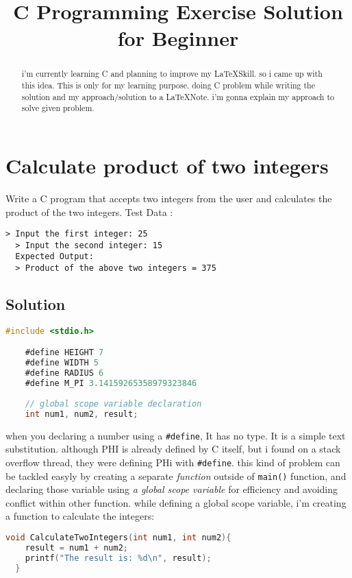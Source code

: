 \documentclass{article}
\title{C Programming Exercise Solution for Beginner}
\begin{document}
  \maketitle

  \begin{abstract}
  i'm currently learning C and planning to improve my \LaTeX Skill. so i came up with this idea. This is only for my learning purpose. doing C problem while writing the solution and
  my approach/solution to a \LaTeX Note. i'm gonna explain my approach to solve given problem.
  \end{abstract}

  \section{Calculate product of two integers}
  
  Write a C program that accepts two integers from the user and calculates the product of the two integers.
  Test Data :
  
  \begin{lstlisting}[style=plainstyle]
  > Input the first integer: 25
  > Input the second integer: 15
  Expected Output:
  > Product of the above two integers = 375
  \end{lstlisting}
  
  \subsection{Solution}
  \begin{lstlisting}[language=C, caption=Defining required Variable]
    #include <stdio.h>

    #define HEIGHT 7
    #define WIDTH 5
    #define RADIUS 6
    #define M_PI 3.14159265358979323846
    
    // global scope variable declaration
    int num1, num2, result;
  \end{lstlisting}
  
  when you declaring a number using a \texttt{\#define}, It has no type. It is a simple text substitution. although PHI is already defined by C itself, but i found on a stack overflow thread, they were defining PHi with \texttt{\#define}.
  this kind of problem can be tackled easyly by creating a separate \textit{function} outside of \texttt{main()} function, and declaring those variable using \textit{a global scope variable} for efficiency and avoiding conflict within other function. 
  while defining a global scope variable, i'm creating a function to calculate the integers:
  \begin{lstlisting}[language=C, caption=function]
  void CalculateTwoIntegers(int num1, int num2){
    result = num1 + num2;
    printf("The result is: %d\n", result);
  }
  \end{lstlisting}
\end{document}

